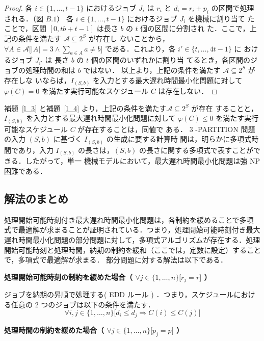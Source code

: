 \documentclass[12pt]{optlab-bachelor}
\begin{document}
\begin{proof}
  各 $i \in \{1,\ldots,t - 1\}$ におけるジョブ $J_i$ は $r_i$ と $d_i =
  r_i + p_i$ の区間で処理される．（図 $B.1$）
  各 $i \in \{1,\ldots,t - 1\}$ におけるジョブ $J_i$ を機械に割り当て
  たことで，区間 $[0,tb + t - 1]$ は長さ $b$ の $t$ 個の区間に分割され
  た．ここで，上記の条件を満たす $\mathcal{A} \subseteq 2^S$ が存在し
  ないことから，$\forall A \in \mathcal{A}\big[|A| = 3 \land \sum_{a \in
  A}a \neq b \big]$ である．これより，各 $i' \in \{t,\ldots,4t - 1\}$ に
  おけるジョブ $J_{i'}$ は 長さ $b$ の $t$ 個の区間のいずれかに割り当
  てるとき，各区間のジョブの処理時間の和は $b$ ではない．
  以上より，上記の条件を満たす $\mathcal{A} \subseteq 2^S$ が存在しな
  いならば，$I_{(S,b)}$ を入力とする最大遅れ時間最小化問題に対して
  $\varphi(C) = 0$ を満たす実行可能なスケジュール $C$ は存在しない．
\end{proof}

補題~\ref{l_3} と補題~\ref{l_4} より，上記の条件を満たす$\mathcal{A} \subseteq 2^S$ が存在
することと，$I_{(S,b)}$ を入力とする最大遅れ時間最小化問題に対して
$\varphi(C) \le  0$
を満たす実行可能なスケジュール $C$ が存在することは，同値で
ある．
3 -PARTITION 問題の入力 $(S,b)$ に基づく $I_{(S,b)}$ の生成に要する計算時
間は，明らかに多項式時間であり，入力 $I_{(S,b)}$ の長さは，$(S, b)$
の長さに関する多項式で表すことができる．したがって，単一
機械モデルにおいて，最大遅れ時間最小化問題は強 NP 困難である．

\subsection{解法のまとめ}
処理開始可能時刻付き最大遅れ時間最小化問題は，各制約を緩めることで多項
式で最適解が求まることが証明されている．つまり，処理開始可能時刻付き最大遅れ時間最小化問題の部分問題に対して，多項式アルゴリズムが存在する．処理開始可能時刻と処理時間，納期の制約を緩和（ここでは，定数に設定）することで，多項式で最適解が求まる．
部分問題に対する解法は以下である．

\noindent\textbf{処理開始可能時刻の制約を緩めた場合（ $\forall j \in \{1,\ldots,n\}\big[ r_j = r \big]$ ）}

ジョブを納期の昇順で処理する( EDD ルール ) ．つまり，スケジュールにおける任意の 2 つのジョブは以下の条件を満たす．
$$\forall i, j \in \{1,\ldots,n\}\big[d_i \le d_j \Rightarrow C(i) \le C(j)\big]$$


\noindent\textbf{処理時間の制約を緩めた場合（ $\forall j \in \{1,\ldots,n\}\big[ p_j = p \big]$ ）}
\end{document}
